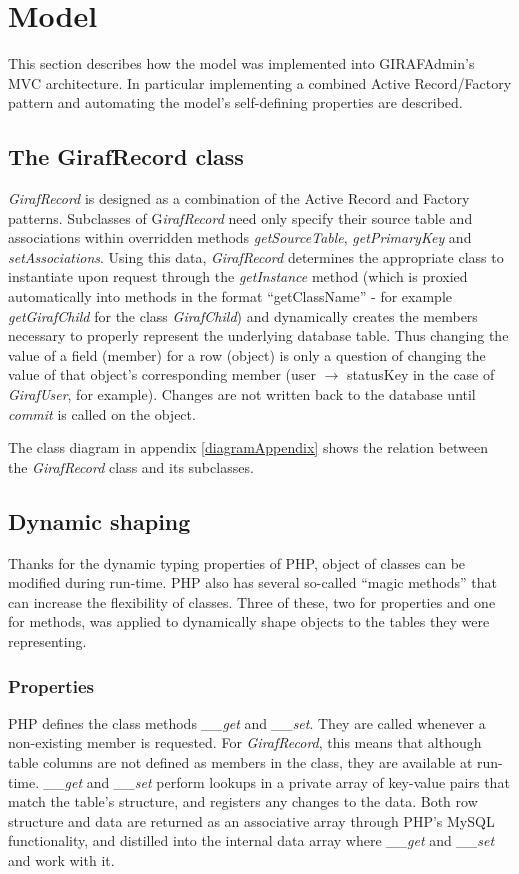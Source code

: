\section{Model}
\label{model}
This section describes how the model was implemented into GIRAFAdmin's MVC architecture. In particular implementing a combined Active Record/Factory pattern and automating the model's self-defining properties are described.

\subsection{The GirafRecord class}
\emph{GirafRecord} is designed as a combination of the Active Record and Factory patterns. Subclasses of G\emph{irafRecord} need only specify their source table and associations within overridden methods \emph{getSourceTable}, \emph{getPrimaryKey} and \emph{setAssociations}. Using this data, \emph{GirafRecord} determines the appropriate class to instantiate upon request through the \emph{getInstance} method (which is proxied automatically into methods in the format ``getClassName'' - for example \emph{getGirafChild} for the class \emph{GirafChild}) and dynamically creates the members necessary to properly represent the underlying database table. Thus changing the value of a field (member) for a row (object) is only a question of changing the value of that object's corresponding member (user $\rightarrow$ statusKey in the case of \emph{GirafUser}, for example). Changes are not written back to the database until \emph{commit} is called on the object.

The class diagram in appendix \ref{diagramAppendix} shows the relation between the \emph{GirafRecord} class and its subclasses.

\subsection{Dynamic shaping}
Thanks for the dynamic typing properties of PHP, object of classes can be modified during run-time. PHP also has several so-called ``magic methods'' that can increase the flexibility of classes. Three of these, two for properties and one for methods, was applied to dynamically shape objects to the tables they were representing.

\subsubsection*{Properties}
PHP defines the class methods \emph{\_\_get} and \emph{\_\_set}. They are called whenever a non-existing member is requested. For \emph{GirafRecord}, this means that although table columns are not defined as members in the class, they are available at run-time. \emph{\_\_get} and \emph{\_\_set} perform lookups in a private array of key-value pairs that match the table's structure, and registers any changes to the data.
Both row structure and data are returned as an associative array through PHP's MySQL functionality, and distilled into the internal data array where \emph{\_\_get} and \emph{\_\_set} and work with it.

